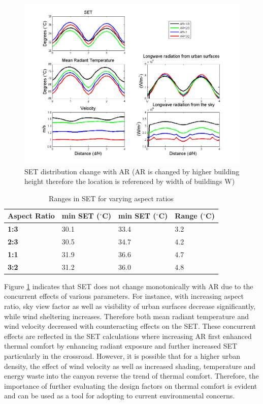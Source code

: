 \documentclass[smallextended]{svjour3}
\begin{document}
\begin{figure}[!h]
\graphicspath{ {image/} }
\centerline{\includegraphics[width=\textwidth]{aspectratio_variables.png}}
\caption{SET distribution change with AR (AR is changed by higher building height therefore the location is referenced by width of buildings W)}
\label{Fig.AR}
\end{figure}

\begin{table}[!h]
\centering
\caption{Ranges in SET for varying aspect ratios}
\label{table:AR_range}
\begin{tabular}{llll}
  Aspect Ratio  & \textbf{min SET ($^{\circ}$C)} & \textbf{min SET ($^{\circ}$C)} & \textbf{Range ($^{\circ}$C)}\\ \hline
\multicolumn{1}{l|}{\textbf{1:3}} &     30.1     &     33.4      &   3.2        \\
\multicolumn{1}{l|}{\textbf{2:3}} &      30.5     &     34.7      &  4.2         \\
\multicolumn{1}{l|}{\textbf{1:1}} &      31.9     &     36.6      &   4.7       \\
\multicolumn{1}{l|}{\textbf{3:2}} &      31.2     &      36.0     &  4.8        
\end{tabular}
\end{table}

Figure \ref{Fig.AR} indicates that SET does not change monotonically with AR due to the concurrent effects of various parameters.  For instance, with increasing aspect ratio, sky view factor as well as visibility of urban surfaces decrease significantly, while wind sheltering increases. Therefore both mean radiant temperature  and wind velocity decreased with counteracting effects on the SET. These concurrent effects are reflected in the SET calculations where increasing AR first enhanced thermal comfort by enhancing radiant exposure and further increased SET particularly in the crossroad.  However, it is possible that for a higher urban density, the effect of wind velocity as well as increased shading, temperature and energy waste into the canyon reverse the trend of thermal comfort. Therefore, the importance of further evaluating the design factors on thermal comfort is evident and can be used as a tool for adopting to current environmental concerns. 
\end{document}
